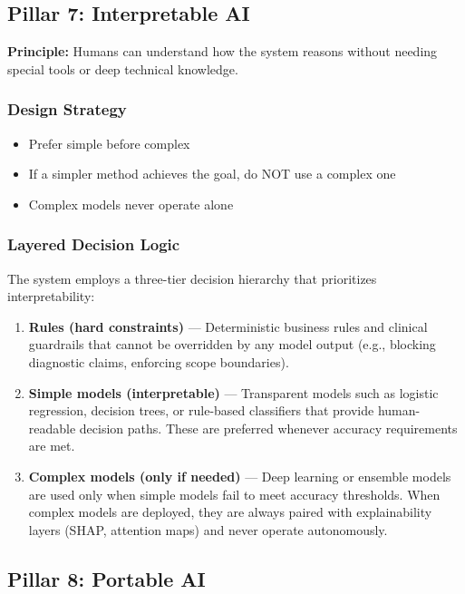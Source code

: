 \subsection{Pillar 7: Interpretable AI}

\textbf{Principle:} Humans can understand how the system reasons without needing special tools or deep technical knowledge.

\subsubsection{Design Strategy}
\begin{itemize}
    \item Prefer simple before complex
    \item If a simpler method achieves the goal, do NOT use a complex one
    \item Complex models never operate alone
\end{itemize}

\subsubsection{Layered Decision Logic}

The system employs a three-tier decision hierarchy that prioritizes interpretability:

\begin{enumerate}
    \item \textbf{Rules (hard constraints)} --- Deterministic business rules and clinical guardrails that cannot be overridden by any model output (e.g., blocking diagnostic claims, enforcing scope boundaries).
    \item \textbf{Simple models (interpretable)} --- Transparent models such as logistic regression, decision trees, or rule-based classifiers that provide human-readable decision paths. These are preferred whenever accuracy requirements are met.
    \item \textbf{Complex models (only if needed)} --- Deep learning or ensemble models are used only when simple models fail to meet accuracy thresholds. When complex models are deployed, they are always paired with explainability layers (SHAP, attention maps) and never operate autonomously.
\end{enumerate}

\subsection{Pillar 8: Portable AI}

